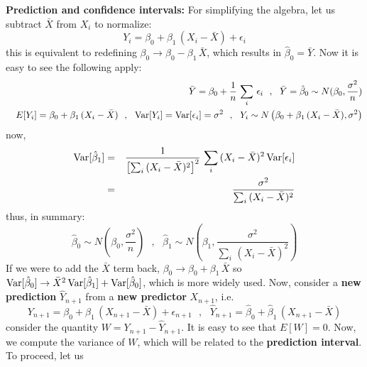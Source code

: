 \documentclass[aps,prl,preprint,superscriptaddress]{revtex4-1}
\begin{document}
{\bf Prediction and confidence intervals:} For simplifying the algebra, let us subtract ${\bar X}$ from $X_i$
to normalize:
%
\begin{equation}
Y_i = \beta_0 + \beta_1\, (X_i - {\bar X}) + \epsilon_i
\end{equation}
%
this is equivalent to redefining $\beta_0 \rightarrow \beta_0 - \beta_1\, {\bar X}$, which results in
${\hat \beta}_0 = {\bar Y}$. Now it is easy to see the following apply:
%
\begin{eqnarray}
&& {\bar Y} = \beta_0 + \frac{1}{n}\, \sum_i\, \epsilon_i \,\,\,\, , \,\,\,\, 
{\bar Y} = {\hat \beta}_0 \sim N(\beta_0, \frac{\sigma^2}{n}) \nonumber\\
&& E[Y_i] = \beta_0 + \beta_1\, (X_i - {\bar X}) \,\,\,\, , \,\,\,\, {\rm Var}[Y_i] = {\rm Var}[\epsilon_i] = \sigma^2 \,\,\,\, , \,\,\,\,
   Y_i \sim N\left( \beta_0 + \beta_1\, ( X_i - {\bar X}), \sigma^2 \right) \nonumber\\ 
\end{eqnarray}
%
now, 
%
\begin{eqnarray}
{\rm Var}[{\hat \beta}_1] &=& \frac{1}{\left[ \sum_i\, (X_i - {\bar X})^2  \right]^2 }\, 
    \sum_i\, (X_i - {\bar X})^2\, {\rm Var}[\epsilon_i] \nonumber\\
                          &=& \frac{\sigma^2}{\sum_i\, (X_i - {\bar X})^2} \nonumber\\  
\end{eqnarray}
%
thus, in summary:
%
\begin{equation}
\boxed{ {\hat \beta}_0 \sim N\left( \beta_0, \frac{\sigma^2}{n} \right) \,\,\,\, , \,\,\,\,
        {\hat \beta}_1 \sim N\left( \beta_1, \frac{\sigma^2}{\sum_i\, (X_i - {\bar X})^2} \right)  }
\end{equation}
%
If we were to add the ${\bar X}$ term back, $\beta_0 \rightarrow \beta_0 + \beta_1\, {\bar X}$ so 
${\rm Var}[{\hat \beta}_0] \rightarrow {\bar X}^2\, {\rm Var}[{\hat \beta}_1] + {\rm Var}[{\hat \beta}_0]$,
which is more widely used.
%
Now, consider a {\bf new prediction} ${\hat Y}_{n+1}$ from a {\bf new predictor} $X_{n+1}$, i.e.
%
\begin{equation}
Y_{n+1} = \beta_0 + \beta_1\, (X_{n+1} - {\bar X}) + \epsilon_{n+1} \,\,\,\, , \,\,\,\,
{\hat Y}_{n+1} = {\hat \beta}_0 + {\hat \beta}_1\, (X_{n+1} - {\bar X})
\end{equation}
%
consider the quantity $W = Y_{n+1} - {\hat Y}_{n+1}$. It is easy to see that $E[W] = 0$. Now, we compute the 
variance of $W$, which will be related to the {\bf prediction interval}. To proceed, let us
\end{document}
